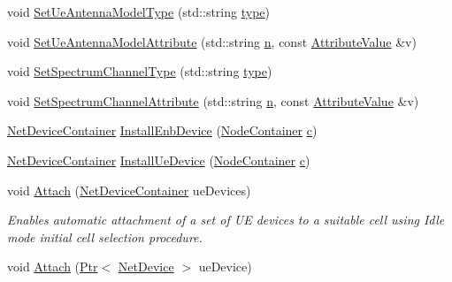 \begin{DoxyCompactItemize}
\item 
void \hyperlink{classns3_1_1LteHelper_a25776edcddd106e5890d95ebebe68e40}{Set\+Ue\+Antenna\+Model\+Type} (std\+::string \hyperlink{visualizer-ideas_8txt_add98db9e15e2a58cf2b57623e7aa893a}{type})
\item 
void \hyperlink{classns3_1_1LteHelper_abbd43f2b889500f26ae779546d5a14c2}{Set\+Ue\+Antenna\+Model\+Attribute} (std\+::string \hyperlink{lte__link__budget__x2__handover__measures_8m_abdb05bc5a064cf642a06c83b3392f148}{n}, const \hyperlink{classns3_1_1AttributeValue}{Attribute\+Value} \&v)
\item 
void \hyperlink{classns3_1_1LteHelper_a8629b4cbc04f51c51c3b2431a42b0763}{Set\+Spectrum\+Channel\+Type} (std\+::string \hyperlink{visualizer-ideas_8txt_add98db9e15e2a58cf2b57623e7aa893a}{type})
\item 
void \hyperlink{classns3_1_1LteHelper_ad98c0c1e7814f5591113a1c288393132}{Set\+Spectrum\+Channel\+Attribute} (std\+::string \hyperlink{lte__link__budget__x2__handover__measures_8m_abdb05bc5a064cf642a06c83b3392f148}{n}, const \hyperlink{classns3_1_1AttributeValue}{Attribute\+Value} \&v)
\item 
\hyperlink{classns3_1_1NetDeviceContainer}{Net\+Device\+Container} \hyperlink{classns3_1_1LteHelper_a5e009ad35ef85f46b5a6099263f15a03}{Install\+Enb\+Device} (\hyperlink{classns3_1_1NodeContainer}{Node\+Container} \hyperlink{mmwave_2model_2fading-traces_2fading__trace__generator_8m_ae0323a9039add2978bf5b49550572c7c}{c})
\item 
\hyperlink{classns3_1_1NetDeviceContainer}{Net\+Device\+Container} \hyperlink{classns3_1_1LteHelper_ac9cd932d7de92811cfa953c2e3b2fc9f}{Install\+Ue\+Device} (\hyperlink{classns3_1_1NodeContainer}{Node\+Container} \hyperlink{mmwave_2model_2fading-traces_2fading__trace__generator_8m_ae0323a9039add2978bf5b49550572c7c}{c})
\item 
void \hyperlink{classns3_1_1LteHelper_a9466743f826aa2652a87907b7f0a1c87}{Attach} (\hyperlink{classns3_1_1NetDeviceContainer}{Net\+Device\+Container} ue\+Devices)
\begin{DoxyCompactList}\small\item\em Enables automatic attachment of a set of UE devices to a suitable cell using Idle mode initial cell selection procedure. \end{DoxyCompactList}\item 
void \hyperlink{classns3_1_1LteHelper_a006b68f1787555d91de76182e06cf9c0}{Attach} (\hyperlink{classns3_1_1Ptr}{Ptr}$<$ \hyperlink{classns3_1_1NetDevice}{Net\+Device} $>$ ue\+Device)

\end{DoxyCompactItemize}
